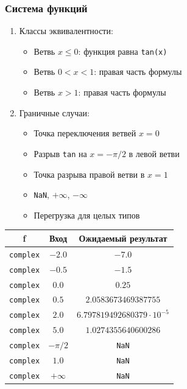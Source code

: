 \documentclass[12pt,a4paper]{report}
\begin{document}
\subsubsection*{Система функций}
\begin{enumerate}
    \item Классы эквивалентности:
          \begin{itemize}
              \item Ветвь $x \le 0$: функция равна \texttt{tan(x)}
              \item Ветвь $0 < x < 1$: правая часть формулы
              \item Ветвь $x > 1$: правая часть формулы
          \end{itemize}
    \item Граничные случаи:
          \begin{itemize}
              \item Точка переключения ветвей $x=0$
              \item Разрыв \texttt{tan} на $x=-\pi/2$ в левой ветви
              \item Точка разрыва правой ветви в $x=1$
              \item \texttt{NaN}, $+\infty$, $-\infty$
              \item Перегрузка для целых типов
          \end{itemize}
\end{enumerate}
\begin{center}
    \begin{tabular}{|c|c|c|}
        \hline
        \textbf{f} & \textbf{Вход} & \textbf{Ожидаемый результат} \\
        \hline
        \texttt{complex} & $-2.0$ & $-7.0$ \\
        \hline
        \texttt{complex} & $-0.5$ & $-1.5$ \\
        \hline
        \texttt{complex} & $0.0$ & $0.25$ \\
        \hline
        \texttt{complex} & $0.5$ & $2.0583673469387755$ \\
        \hline
        \texttt{complex} & $2.0$ & $6.797819492680379 \cdot 10^{-5}$ \\
        \hline
        \texttt{complex} & $5.0$ & $1.0274355640600286$ \\
        \hline
        \texttt{complex} & $-\pi/2$ & \texttt{NaN} \\
        \hline
        \texttt{complex} & $1.0$ & \texttt{NaN} \\
        \hline
        \texttt{complex} & $+\infty$ & \texttt{NaN} \\
        \hline
    \end{tabular}
\end{center}
\end{document}
